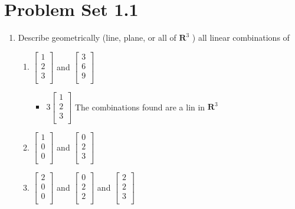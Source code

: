 \documentclass[12pt,letterpaper]{article}
\begin{document}
\section{Problem Set 1.1} 
\begin{enumerate}
    \item Describe geometrically (line, plane, or all of $\textbf{R}^3$ ) all linear combinations of 
    \begin{enumerate}
        \item $\begin{bmatrix}
1 \\
2 \\
3 \\
\end{bmatrix}$ and $\begin{bmatrix}
3 \\
6 \\
9 \\
\end{bmatrix}$
\begin{itemize}
    \item $3\begin{bmatrix} 
1 \\
2 \\
3 \\
\end{bmatrix}$ The combinations found are a lin in $\textbf{R}^3$
\end{itemize}
        \item $\begin{bmatrix}
1 \\
0 \\
0 \\
\end{bmatrix}$ and $\begin{bmatrix}
0 \\
2 \\
3 \\
\end{bmatrix}$
        \item $\begin{bmatrix}
2 \\
0 \\
0 \\
\end{bmatrix}$ and $\begin{bmatrix}
0 \\
2 \\
2 \\
\end{bmatrix}$ and $\begin{bmatrix}
2 \\
2 \\
3 \\
\end{bmatrix}$
    \end{enumerate}
\end{enumerate}
\end{document}
